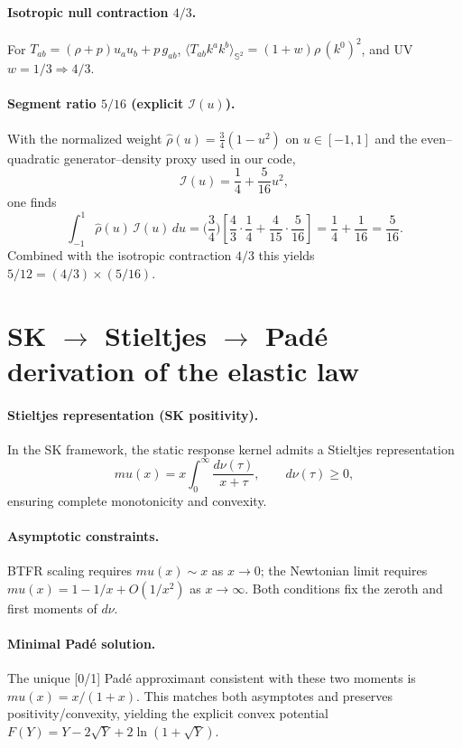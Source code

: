 \documentclass[aps,prd,onecolumn,superscriptaddress,nofootinbib]{revtex4-2}
\def\mu{mu}%
\begin{document}
\paragraph{Isotropic null contraction \(4/3\).} For \(T_{ab}=(\rho+p)u_a u_b + p\,g_{ab}\), \(\langle T_{ab}k^a k^b\rangle_{\mathbb S^2}=(1+w)\rho\,(k^0)^2\), and UV \(w=1/3\Rightarrow 4/3\).

\paragraph{Segment ratio \(5/16\) (explicit \(\mathcal I(u)\)).}
With the normalized weight \(\hat\rho(u)=\tfrac{3}{4}(1-u^2)\) on \(u\in[-1,1]\) and the even–quadratic generator–density proxy used in our code,
\[
\mathcal I(u)=\frac{1}{4}+\frac{5}{16}u^2,
\]
one finds
\[
\int_{-1}^{1}\! \hat\rho(u)\,\mathcal I(u)\,du
=\Big(\frac{3}{4}\Big)\!\left[\frac{4}{3}\cdot\frac{1}{4}+\frac{4}{15}\cdot\frac{5}{16}\right]
=\frac{1}{4}+\frac{1}{16}
=\frac{5}{16}.
\]
Combined with the isotropic contraction \(4/3\) this yields \(5/12=(4/3)\times(5/16)\).

\section{SK $\to$ Stieltjes $\to$ Padé derivation of the elastic law}
\label{app:stieltjes}

\paragraph{Stieltjes representation (SK positivity).}
In the SK framework, the static response kernel admits a Stieltjes
representation
\[
\mu(x)=x\int_0^\infty \frac{d\nu(\tau)}{x+\tau},\qquad d\nu(\tau)\ge0,
\]
ensuring complete monotonicity and convexity.

\paragraph{Asymptotic constraints.}
BTFR scaling requires \(\mu(x)\sim x\) as \(x\to 0\);
the Newtonian limit requires \(\mu(x)=1-1/x+O(1/x^2)\) as \(x\to\infty\).
Both conditions fix the zeroth and first moments of \(d\nu\).

\paragraph{Minimal Padé solution.}
The unique [0/1] Padé approximant consistent with these two moments is
\(\mu(x)=x/(1+x)\).
This matches both asymptotes and preserves positivity/convexity,
yielding the explicit convex potential
\(F(Y)=Y-2\sqrt{Y}+2\ln(1+\sqrt{Y})\).
\end{document}
